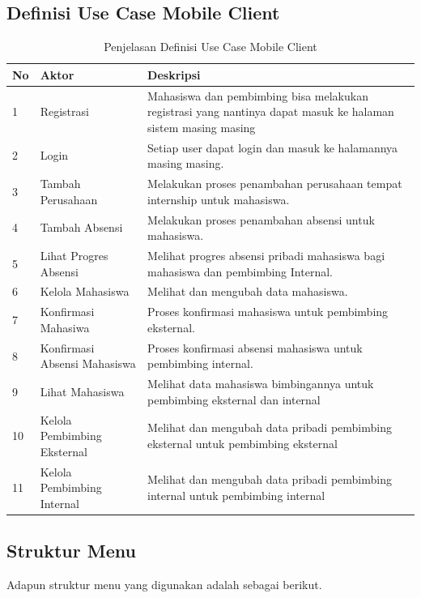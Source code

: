 \newpage

\subsection{Definisi Use Case Mobile Client }	
\begin{table}[h!]
\centering
\begin{tabular}{| l | p{4cm} | p{6cm} |} 
 \hline
 \textbf{No}   & \textbf{Aktor} & \textbf{Deskripsi}\\ 
\hline
1   & Registrasi & Mahasiswa dan pembimbing bisa melakukan registrasi yang nantinya dapat masuk ke halaman sistem masing masing\\ 
\hline
2   & Login& Setiap user dapat login dan masuk ke halamannya masing masing.\\ 
\hline
3   & Tambah Perusahaan & Melakukan proses penambahan perusahaan tempat internship untuk mahasiswa.\\ 
 \hline
4   & Tambah Absensi & Melakukan proses penambahan absensi untuk mahasiswa.\\ 
 \hline
5   & Lihat Progres Absensi & Melihat progres absensi pribadi mahasiswa bagi  mahasiswa dan pembimbing Internal.\\ 
 \hline
6   & Kelola Mahasiswa & Melihat dan mengubah data mahasiswa.\\ 
 \hline
7   & Konfirmasi Mahasiwa & Proses konfirmasi mahasiswa untuk pembimbing eksternal.\\ 
 \hline
8   & Konfirmasi Absensi Mahasiswa & Proses konfirmasi absensi mahasiswa untuk pembimbing internal.\\ 
 \hline
9   & Lihat Mahasiswa & Melihat data mahasiswa bimbingannya untuk pembimbing eksternal dan internal\\ 
 \hline
10   & Kelola Pembimbing Eksternal & Melihat dan mengubah data pribadi pembimbing eksternal untuk pembimbing eksternal\\ 
 \hline
11  & Kelola Pembimbing Internal & Melihat dan mengubah data pribadi pembimbing internal untuk pembimbing internal\\ 
 \hline

\end{tabular}
\caption{Penjelasan Definisi Use Case Mobile Client}
\label{table:9}
\end{table}

\newpage
\subsection{Struktur Menu}
Adapun struktur menu yang digunakan adalah sebagai berikut.
